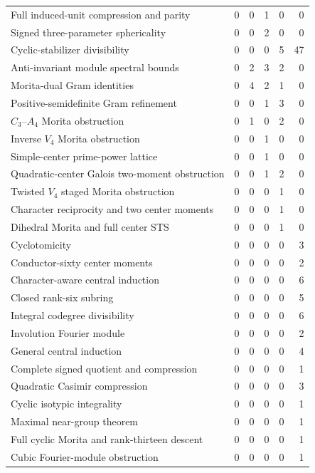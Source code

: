{\begin{longtable}{@{}l r r r r r @{}}
Full induced-unit compression and parity & 0 & 0 & 1 & 0 & 0\\
Signed three-parameter sphericality & 0 & 0 & 2 & 0 & 0\\
Cyclic-stabilizer divisibility & 0 & 0 & 0 & 5 & 47\\
Anti-invariant module spectral bounds & 0 & 2 & 3 & 2 & 0\\
Morita-dual Gram identities & 0 & 4 & 2 & 1 & 0\\
Positive-semidefinite Gram refinement & 0 & 0 & 1 & 3 & 0\\
$C_3$--$A_4$ Morita obstruction & 0 & 1 & 0 & 2 & 0\\
Inverse $V_4$ Morita obstruction & 0 & 0 & 1 & 0 & 0\\
Simple-center prime-power lattice & 0 & 0 & 1 & 0 & 0\\
Quadratic-center Galois two-moment obstruction & 0 & 0 & 1 & 2 & 0\\
Twisted $V_4$ staged Morita obstruction & 0 & 0 & 0 & 1 & 0\\
Character reciprocity and two center moments & 0 & 0 & 0 & 1 & 0\\
Dihedral Morita and full center STS & 0 & 0 & 0 & 1 & 0\\
Cyclotomicity & 0 & 0 & 0 & 0 & 3\\
Conductor-sixty center moments & 0 & 0 & 0 & 0 & 2\\
Character-aware central induction & 0 & 0 & 0 & 0 & 6\\
Closed rank-six subring & 0 & 0 & 0 & 0 & 5\\
Integral codegree divisibility & 0 & 0 & 0 & 0 & 6\\
Involution Fourier module & 0 & 0 & 0 & 0 & 2\\
General central induction & 0 & 0 & 0 & 0 & 4\\
Complete signed quotient and compression & 0 & 0 & 0 & 0 & 1\\
Quadratic Casimir compression & 0 & 0 & 0 & 0 & 3\\
Cyclic isotypic integrality & 0 & 0 & 0 & 0 & 1\\
Maximal near-group theorem & 0 & 0 & 0 & 0 & 1\\
Full cyclic Morita and rank-thirteen descent & 0 & 0 & 0 & 0 & 1\\
Cubic Fourier-module obstruction & 0 & 0 & 0 & 0 & 1\\
\end{longtable}
}

